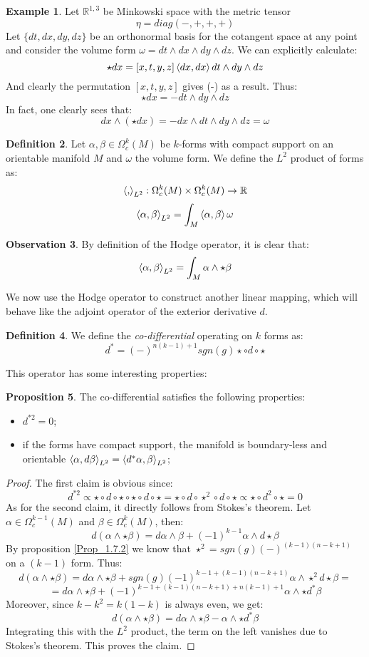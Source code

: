 \documentclass[12pt,a4paper]{report}
\theoremstyle{definition}
\newtheorem{Def}{Definition}[chapter]
\theoremstyle{Theorem}
\newtheorem{Prop}[Def]{Proposition}
\theoremstyle{definition}
\newtheorem{Ex}[Def]{Example}
\theoremstyle{definition}
\newtheorem{Obs}[Def]{Observation}
\begin{document}
	\begin{Ex}
		Let $\mathbb{R}^{1,3}$ be Minkowski space with the metric tensor $$\eta=diag(-,+,+,+)$$ 
		Let $\{dt,dx,dy,dz\}$ be an orthonormal basis for the cotangent space at any point and consider the volume form $\omega=dt\wedge dx\wedge dy\wedge dz$. We can explicitly calculate:
		$$\star dx=[x,t,y,z]\braket{dx,dx}dt\wedge dy\wedge dz$$
		And clearly the permutation $[x,t,y,z]$ gives (-) as a result. Thus:
		$$\star dx=-dt\wedge dy\wedge dz$$
		In fact, one clearly sees that:
		$$dx\wedge (\star dx)=-dx\wedge dt\wedge dy\wedge dz=\omega$$
	\end{Ex}
	\begin{Def}\label{Def_1.10.2}
		Let $\alpha,\beta\in\Omega^k_c(M)$ be $k$-forms with compact support on an orientable manifold $M$ and $\omega$ the volume form. We define the $L^2$ product of forms as:
		$$\braket{,}_{L^2}:\Omega^k_c(M)\times \Omega^k_c(M)\rightarrow \mathbb{R}$$
		$$\braket{\alpha,\beta}_{L^2}=\int_M\braket{\alpha,\beta}\omega$$
	\end{Def}
	\begin{Obs}
		By definition of the Hodge operator, it is clear that:
		$$\braket{\alpha,\beta}_{L^2}=\int_M\alpha\wedge\star\beta$$
	\end{Obs}
	We now use the Hodge operator to construct another linear mapping, which will behave like the adjoint operator of the exterior derivative $d$.
	\begin{Def}
		We define the \textit{co-differential} operating on $k$ forms as:
		$$d^*=(-)^{n(k-1)+1}sgn(g)\star \circ  d\circ\star$$
	\end{Def}
	This operator has some interesting properties:
	\begin{Prop}
		The co-differential satisfies the following properties:
		\begin{itemize}
			\item $d^{*2}=0$;
			\item if the forms have compact support, the manifold is boundary-less and orientable $\braket{\alpha,d\beta}_{L^2}=\braket{d^*\alpha,\beta}_{L^2}$;
		\end{itemize}
	\end{Prop}
	\begin{proof}
		The first claim is obvious since:
		$$d^{*2}\propto\star \circ  d\circ\star\circ\star \circ  d\circ\star=\star \circ  d\circ\star^2\circ  d\circ\star\propto\star\circ d^2\circ\star=0$$
		As for the second claim, it directly follows from Stokes's theorem. Let $\alpha\in\Omega^{k-1}_c(M)$ and $\beta\in\Omega^{k}_c(M)$, then:
		$$d(\alpha\wedge \star\beta)=d\alpha\wedge\beta+(-1)^{k-1}\alpha\wedge d\star\beta$$
		By proposition \ref{Prop_1.7.2} we know that $\star^2=sgn(g)(-)^{(k-1)(n-k+1)}$ on a $(k-1)$ form. Thus:
		$$d(\alpha\wedge \star\beta)=
		d\alpha\wedge\star\beta+sgn(g)(-1)^{k-1+(k-1)(n-k+1)}\alpha\wedge \star^2 d\star\beta=$$
		$$=d\alpha\wedge\star\beta+(-1)^{k-1+(k-1)(n-k+1)+n(k-1)+1}\alpha\wedge \star d^*\beta$$
		Moreover, since $k-k^2=k(1-k)$ is always even, we get:
		$$d(\alpha\wedge \star\beta)=d\alpha\wedge \star\beta-\alpha\wedge \star d^*\beta$$
		Integrating this with the $L^2$ product, the term on the left vanishes due to Stokes's theorem. This proves the claim.
	\end{proof}
\end{document}
